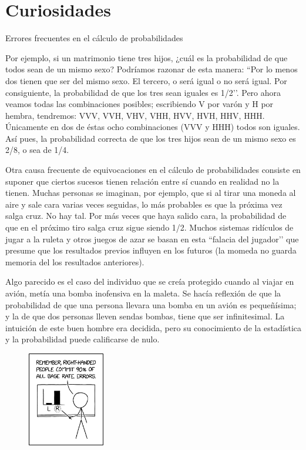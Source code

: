 \section{Curiosidades}


\begin{myexampleblock} {Errores frecuentes en el cálculo de probabilidades}

\vspace{2mm} Por ejemplo, si un matrimonio tiene tres hijos, ¿cuál es la probabilidad de que todos sean de un mismo sexo? Podríamos razonar de esta manera: ``Por lo menos dos tienen que ser del mismo sexo. El tercero, o será igual o no será igual. Por consiguiente, la probabilidad de que los tres sean iguales es 1/2’’. Pero ahora veamos todas las combinaciones posibles; escribiendo V por varón y H por hembra, tendremos: VVV, VVH, VHV, VHH, HVV, HVH, HHV, HHH. Únicamente en dos de éstas ocho combinaciones (VVV y HHH) todos son iguales. Así pues, la probabilidad correcta de que los tres hijos sean de un mismo sexo es 2/8, o sea de 1/4.

\vspace{2mm} Otra causa frecuente de equivocaciones en el cálculo de probabilidades consiste en suponer que ciertos sucesos tienen relación entre sí cuando en realidad no la tienen. Muchas personas se imaginan, por ejemplo, que si al tirar una moneda al aire y sale cara varias veces seguidas, lo más probables es que la próxima vez salga cruz. No hay tal. Por más veces que haya salido cara, la probabilidad de que en el próximo tiro salga cruz sigue siendo 1/2. Muchos sistemas ridículos de jugar a la ruleta y otros juegos de azar se basan en esta ``falacia del jugador’’ que presume que los resultados previos influyen en los futuros (la momeda no guarda memoria del los resultados anteriores).


\vspace{2mm} 
\begin{multicols}{2}
Algo parecido es el caso del individuo que se creía protegido cuando al viajar en avión, metía una bomba inofensiva en la maleta. Se hacía reflexión de que la probabilidad de que una persona llevara una bomba en un avión es pequeñísima; y la de que dos personas lleven sendas bombas, tiene que ser infinitesimal. La intuición de este buen hombre era decidida, pero su conocimiento de la estadística y la probabilidad puede calificarse de nulo.
\begin{figure}[H]
			\centering
			\includegraphics[width=0.3\textwidth]{imagenes/imagenes02/T03IM53.png}
	\end{figure}
\end{multicols}


\end{myexampleblock}

